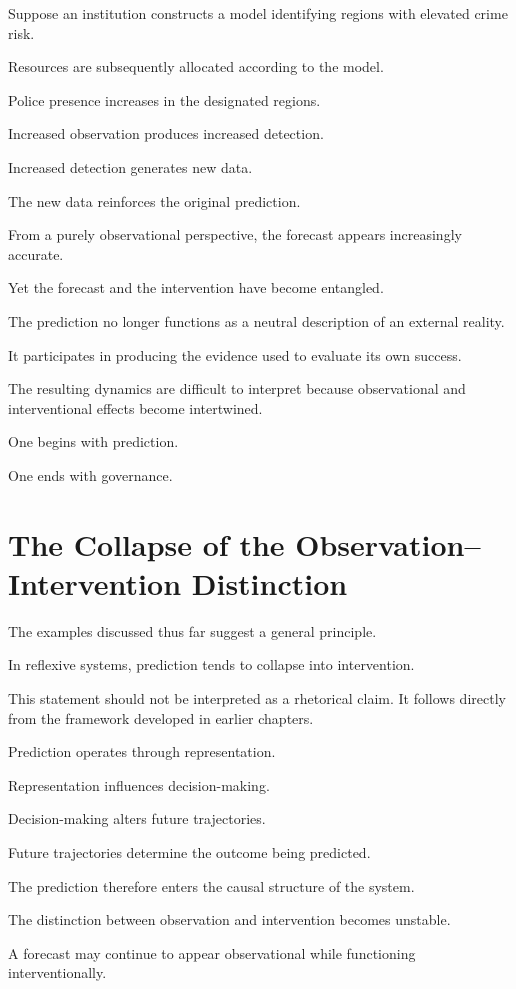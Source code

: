\documentclass[11pt,oneside,openany]{book}
\begin{document}
Suppose an institution constructs a model identifying regions with elevated crime risk.

Resources are subsequently allocated according to the model.

Police presence increases in the designated regions.

Increased observation produces increased detection.

Increased detection generates new data.

The new data reinforces the original prediction.

From a purely observational perspective, the forecast appears increasingly accurate.

Yet the forecast and the intervention have become entangled.

The prediction no longer functions as a neutral description of an external reality.

It participates in producing the evidence used to evaluate its own success.

The resulting dynamics are difficult to interpret because observational and interventional effects become intertwined.

One begins with prediction.

One ends with governance.

\section{The Collapse of the Observation--Intervention Distinction}

The examples discussed thus far suggest a general principle.

In reflexive systems, prediction tends to collapse into intervention.

This statement should not be interpreted as a rhetorical claim. It follows directly from the framework developed in earlier chapters.

Prediction operates through representation.

Representation influences decision-making.

Decision-making alters future trajectories.

Future trajectories determine the outcome being predicted.

The prediction therefore enters the causal structure of the system.

The distinction between observation and intervention becomes unstable.

A forecast may continue to appear observational while functioning interventionally.
\end{document}
